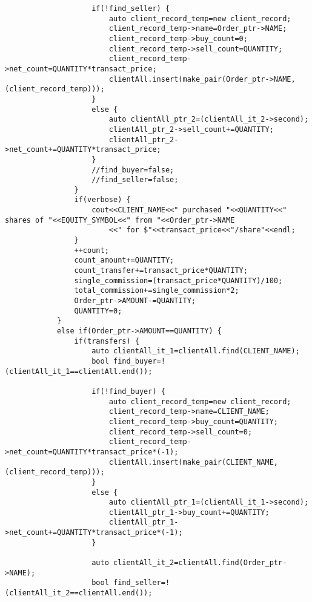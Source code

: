 \documentclass{article}
\begin{document}
\begin{spacing}{1.5}
\begin{lstlisting}
                    if(!find_seller) {
                        auto client_record_temp=new client_record;
                        client_record_temp->name=Order_ptr->NAME;
                        client_record_temp->buy_count=0;
                        client_record_temp->sell_count=QUANTITY;
                        client_record_temp->net_count=QUANTITY*transact_price;
                        clientAll.insert(make_pair(Order_ptr->NAME, (client_record_temp)));
                    }
                    else {
                        auto clientAll_ptr_2=(clientAll_it_2->second);
                        clientAll_ptr_2->sell_count+=QUANTITY;
                        clientAll_ptr_2->net_count+=QUANTITY*transact_price;
                    }
                    //find_buyer=false;
                    //find_seller=false;
                }
                if(verbose) {
                    cout<<CLIENT_NAME<<" purchased "<<QUANTITY<<" shares of "<<EQUITY_SYMBOL<<" from "<<Order_ptr->NAME
                        <<" for $"<<transact_price<<"/share"<<endl;
                }
                ++count;
                count_amount+=QUANTITY;
                count_transfer+=transact_price*QUANTITY;
                single_commission=(transact_price*QUANTITY)/100;
                total_commission+=single_commission*2;
                Order_ptr->AMOUNT-=QUANTITY;
                QUANTITY=0;
            }
            else if(Order_ptr->AMOUNT==QUANTITY) {
                if(transfers) {
                    auto clientAll_it_1=clientAll.find(CLIENT_NAME);
                    bool find_buyer=!(clientAll_it_1==clientAll.end());

                    if(!find_buyer) {
                        auto client_record_temp=new client_record;
                        client_record_temp->name=CLIENT_NAME;
                        client_record_temp->buy_count=QUANTITY;
                        client_record_temp->sell_count=0;
                        client_record_temp->net_count=QUANTITY*transact_price*(-1);
                        clientAll.insert(make_pair(CLIENT_NAME, (client_record_temp)));
                    }
                    else {
                        auto clientAll_ptr_1=(clientAll_it_1->second);
                        clientAll_ptr_1->buy_count+=QUANTITY;
                        clientAll_ptr_1->net_count+=QUANTITY*transact_price*(-1);
                    }

                    auto clientAll_it_2=clientAll.find(Order_ptr->NAME);
                    bool find_seller=!(clientAll_it_2==clientAll.end());


\end{lstlisting}
\end{spacing}
\end{document}
